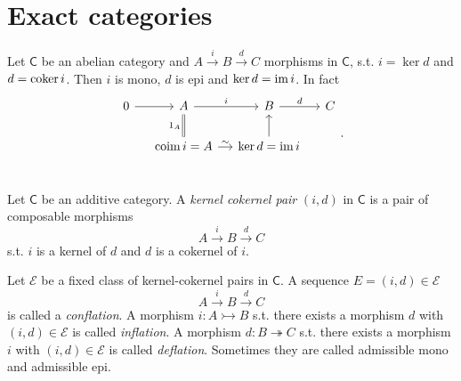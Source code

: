 \section{Exact categories}
\begin{rem}
	Let $\mathsf{C}$ be an abelian category and $A \xrightarrow{i} B \xrightarrow{d} C$ morphisms in $\mathsf{C}$, s.t.
	$i = \ker d$ and $d = \operatorname{coker} i$.
	Then $i$ is mono, $d$ is epi and $\ker d = \operatorname{im} i$.
	In fact 
	\begin{equation}
		\begin{tikzcd}[column sep=small]
		0 \arrow[r, "", rightarrow] &
		A \arrow[r, "i", rightarrow] \arrow[d, "1_A"', equal] &
		B \arrow[r, "d", rightarrow] &
		C \\
		& \mathrm{coim}\, i = A \arrow[r, "\sim", rightarrow] &
		\ker d = \ima i \arrow[u, "", rightarrow] & \\
	\end{tikzcd}
	.\end{equation} 
\end{rem}

\begin{defn}
	Let $\mathsf{C}$ be an additive category.
	A {\em kernel cokernel pair} $\left(i, d\right)$ in $\mathsf{C}$ is a pair of composable morphisms
	\begin{equation}
	A \xrightarrow{i} B \xrightarrow{d} C
	\end{equation} 
	s.t. $i$ is a kernel of $d$ and $d$ is a cokernel of $i$.
\end{defn}

\begin{defn}
	Let $\mathcal{E}$ be a fixed class of kernel-cokernel pairs in $\mathsf{C}$.
	A sequence $E = \left(i, d\right) \in \mathcal{E}$
	\begin{equation}
	A \xrightarrow{i} B \xrightarrow{d} C
	\end{equation} 
	is called a {\em conflation}.
	A morphism $i: A \rightarrowtail B$ s.t. there exists a morphism $d$ with $\left(i, d\right) \in \mathcal{E}$ is called {\em inflation}.
	A morphism $d: B \twoheadrightarrow C$ s.t. there exists a morphism $i$ with $\left(i, d\right) \in \mathcal{E}$ is called {\em deflation}.
	Sometimes they are called admissible mono and admissible epi.
\end{defn}

